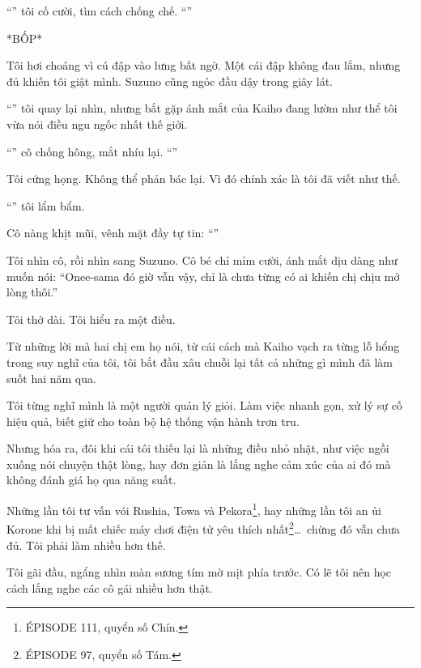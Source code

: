 \documentclass[../main.tex]{subfiles}
\begin{document}
``'' tôi cố cười, tìm cách chống chế. ``''

*BỐP*

Tôi hơi choáng vì cú đập vào lưng bất ngờ. Một cái đập không đau lắm, nhưng đủ khiến tôi giật mình. Suzuno cũng ngóc đầu dậy trong giây lát.

``'' tôi quay lại nhìn, nhưng bắt gặp ánh mắt của Kaiho đang lườm như thể tôi vừa nói điều ngu ngốc nhất thế giới.

``'' cô chống hông, mắt nhíu lại. ``''

Tôi cứng họng. Không thể phản bác lại. Vì đó chính xác là tôi đã viết như thế.

``'' tôi lẩm bẩm.

Cô nàng khịt mũi, vênh mặt đầy tự tin: ``''

Tôi nhìn cô, rồi nhìn sang Suzuno. Cô bé chỉ mỉm cười, ánh mắt dịu dàng như muốn nói: ``Onee-sama đó giờ vẫn vậy, chỉ là chưa từng có ai khiến chị chịu mở lòng thôi.''

Tôi thở dài. Tôi hiểu ra một điều.

Từ những lời mà hai chị em họ nói, từ cái cách mà Kaiho vạch ra từng lỗ hổng trong suy nghĩ của tôi, tôi bắt đầu xâu chuỗi lại tất cả những gì mình đã làm suốt hai năm qua.

Tôi từng nghĩ mình là một người quản lý giỏi. Làm việc nhanh gọn, xử lý sự cố hiệu quả, biết giữ cho toàn bộ hệ thống vận hành trơn tru.

Nhưng hóa ra, đôi khi cái tôi thiếu lại là những điều nhỏ nhặt, như việc ngồi xuống nói chuyện thật lòng, hay đơn giản là lắng nghe cảm xúc của ai đó mà không đánh giá họ qua năng suất.

Những lần tôi tư vấn vói Rushia, Towa và Pekora\footnote{{\flaregothic ÉPISODE 111}, quyển số Chín.}, hay những lần tôi an ủi Korone khi bị mất chiếc máy chơi điện tử yêu thích nhất\footnote{{\flaregothic ÉPISODE 97}, quyển số Tám.}\dots\ chừng đó vẫn chưa đủ. Tôi phải làm nhiều hơn thế.

Tôi gãi đầu, ngẩng nhìn màn sương tím mờ mịt phía trước. Có lẽ tôi nên học cách lắng nghe các cô gái nhiều hơn thật.
\end{document}
